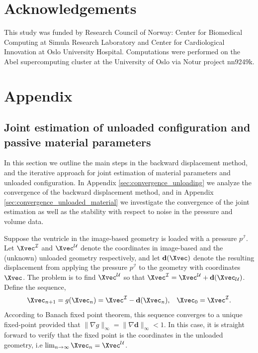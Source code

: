 \section*{Acknowledgements}
This study was funded by Research Council of Norway: Center
for Biomedical Computing at Simula Research Laboratory and Center
for Cardiological Innovation at Oslo University Hospital.
Computations were performed on the Abel supercomputing cluster at
the University of Oslo via Notur project nn9249k. 


\clearpage

\appendix
\section{Appendix}
\subsection{Joint estimation of unloaded
  configuration and passive material parameters}
\label{sec:unloading}
In this section we outline the main steps in the backward displacement
method, and the iterative approach for joint estimation of material
parameters and unloaded configuration. In Appendix
\ref{sec:convergence_unloading} we analyze the convergence of the
backward displacement method, and in Appendix
\ref{sec:convergence_unloaded_material} we investigate the convergence
of the joint estimation as well as the stability with respect to noise
in the pressure and volume data. 

Suppose the ventricle in the image-based geometry is loaded with
a pressure $p^{\mathcal{I}}$.  Let
$\Xvec^{\mathcal{I}}$ and $\Xvec^{\mathcal{U}}$ denote the coordinates
in image-based and the (unknown) unloaded geometry respectively, and
let $\mathbf{d}(\Xvec)$ denote the resulting displacement from applying the
pressure $p^{\mathcal{I}}$ to the geometry with coordinates
$\Xvec$. The problem is to find $\Xvec^{\mathcal{U}}$ so that
$\Xvec^{\mathcal{I}} = \Xvec^{\mathcal{U}} +
\mathbf{d}(\Xvec_{\mathcal{U}})$. Define the sequence,   
\begin{align}
  \Xvec_{n+1} = g(\Xvec_n) =  \Xvec^{\mathcal{I}} - \mathbf{d}(\Xvec_n),
  && \Xvec_0 = \Xvec^{\mathcal{I}}.
    \label{eq:backward_displacement_method}
\end{align}
According to Banach fixed point theorem, this sequence converges to a
unique fixed-point provided that $\| \nabla g \|_{\infty} = \| \nabla \mathbf{d}
\|_{\infty} < 1$. In this case, it is straight forward to verify that
the fixed point is the coordinates in the unloaded geometry, i.e
$\lim_{n \rightarrow \infty} \Xvec_n = \Xvec^{\mathcal{U}}$.



